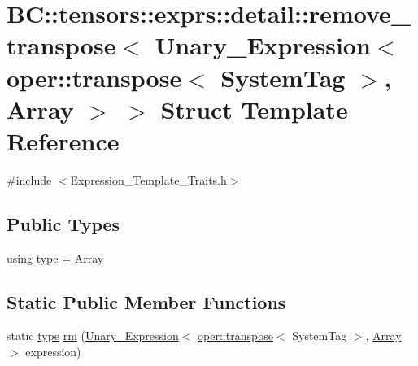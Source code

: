 \hypertarget{structBC_1_1tensors_1_1exprs_1_1detail_1_1remove__transpose_3_01Unary__Expression_3_01oper_1_1tr9d22846580f2535ee6f45835f1520436}{}\section{BC\+:\+:tensors\+:\+:exprs\+:\+:detail\+:\+:remove\+\_\+transpose$<$ Unary\+\_\+\+Expression$<$ oper\+:\+:transpose$<$ System\+Tag $>$, Array $>$ $>$ Struct Template Reference}
\label{structBC_1_1tensors_1_1exprs_1_1detail_1_1remove__transpose_3_01Unary__Expression_3_01oper_1_1tr9d22846580f2535ee6f45835f1520436}


{\ttfamily \#include $<$Expression\+\_\+\+Template\+\_\+\+Traits.\+h$>$}

\subsection*{Public Types}
\begin{DoxyCompactItemize}
\item 
using \hyperlink{structBC_1_1tensors_1_1exprs_1_1detail_1_1remove__transpose_3_01Unary__Expression_3_01oper_1_1tr9d22846580f2535ee6f45835f1520436_a8212c6707b5b63d822e447f598195a65}{type} = \hyperlink{classBC_1_1tensors_1_1exprs_1_1Array}{Array}
\end{DoxyCompactItemize}
\subsection*{Static Public Member Functions}
\begin{DoxyCompactItemize}
\item 
static \hyperlink{structBC_1_1tensors_1_1exprs_1_1detail_1_1remove__transpose_3_01Unary__Expression_3_01oper_1_1tr9d22846580f2535ee6f45835f1520436_a8212c6707b5b63d822e447f598195a65}{type} \hyperlink{structBC_1_1tensors_1_1exprs_1_1detail_1_1remove__transpose_3_01Unary__Expression_3_01oper_1_1tr9d22846580f2535ee6f45835f1520436_a511396dd5a2b10c36c452c6a954f259b}{rm} (\hyperlink{structBC_1_1tensors_1_1exprs_1_1Unary__Expression}{Unary\+\_\+\+Expression}$<$ \hyperlink{structBC_1_1oper_1_1transpose}{oper\+::transpose}$<$ System\+Tag $>$, \hyperlink{classBC_1_1tensors_1_1exprs_1_1Array}{Array} $>$ expression)
\end{DoxyCompactItemize}


